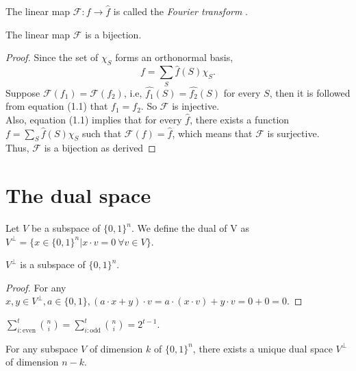 The linear map $\mathcal{F} : f \rightarrow \hat{f}$ is called the \textit{Fourier transform }.

\begin{theorem}
The linear map $\mathcal{F}$ is a bijection.
\end{theorem} 

\begin{proof}
Since the set of $\chi_S$ forms an orthonormal basis, 
\begin{equation}
f = \sum \limits_{S} \hat{f}(S) \chi_S.
\end{equation}
Suppose $\mathcal{F}(f_1) = \mathcal{F}(f_2)$, i.e, $\hat{f_1}(S) = \hat{f_2}(S)$ for every $S$, then it is followed from equation (1.1) that $f_1 = f_2$. So $\mathcal{F}$ is injective. \\
Also, equation (1.1) implies that for every $\hat{f}$, there exists a function $f = \sum \limits_{S} \hat{f}(S) \chi_S $ such that $\mathcal{F}(f) = \hat{f}$, which means that $\mathcal{F}$ is surjective. \\
Thus, $\mathcal{F}$ is a bijection as derived 
\end{proof}

\section{The dual space}
\begin{definition} 
Let $V$ be a subspace of $\{0,1\}^n$. 
We define the dual of V as 
$V^\perp = \{ x \in \{ 0,1 \}^n | x \cdot v = 0 \ \forall v \in V \}$.
\end{definition}

\begin{theorem}
$V^\perp$ is a subspace of $\{ 0,1 \}^n$.
\end{theorem}

\begin{proof}
For any $x, y \in V^\perp, a \in \{0,1\}, (a \cdot x+y)\cdot v = a \cdot (x \cdot v) + y \cdot v = 0 + 0 = 0$. 
\end{proof} 

\begin{lemma} $\sum \limits_{i: \text{even}}^t {n \choose i} = 
\sum \limits_{i: \text{odd}}^t {n \choose i} = 2^{t-1} $.
\end{lemma}

\begin{theorem} For any subspace $V$ of dimension $k$ of $\{ 0,1 \}^n$, 
there exists a unique dual space $V^\perp$ of dimension $n-k$.
\end{theorem}

